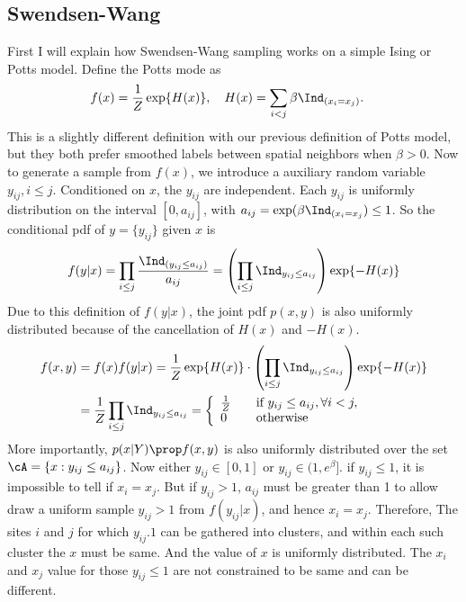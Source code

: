 \documentclass[12pt]{article}
\begin{document}
\subsection{Swendsen-Wang}
First I will explain how Swendsen-Wang sampling works on a simple Ising or Potts model. Define the Potts mode as
\begin{align*}
  f(x) &= \frac{1}{Z}\exp \{H(x)\}, \quad H(x) = \sum_{i<j} \beta \Ind_{(x_i = x_j)}.
\end{align*}
This is a slightly different definition with our previous definition of Potts model, but they both prefer smoothed labels between spatial neighbors when $\beta > 0$. Now to generate a sample from $f(x)$, we introduce a auxiliary random variable $y_{ij}, i \le j$. Conditioned on $x$, the $y_{ij}$ are independent. Each $y_{ij}$ is uniformly distribution on the interval $[0, a_{ij}]$, with $a_{ij} = \exp(\beta\Ind_{(x_i = x_j} ) \leq 1$. So the conditional pdf of $y = \{y_{ij}\}$ given $x$ is
\begin{equation*}
  f(y|x) = \prod_{i\le j}\frac{\Ind_{(y_{ij} \leq a_{ij})}}{a_{ij}} = \left (\prod_{i\le j}\Ind_{y_{ij} \leq a_{ij}} \right )\exp \{-H(x)\}
\end{equation*}
Due to this definition of $f(y|x)$, the joint pdf $p(x,y)$ is also uniformly distributed because of the cancellation of $H(x)$ and $-H(x)$.
\begin{align*}
  f(x,y) &= f(x) f(y|x) = \frac{1}{Z}\exp\{H(x)\} \cdot  \left (\prod_{i\le j}\Ind_{y_{ij} \leq a_{ij}} \right )\exp \{-H(x)\} \\
  & =  \frac{1}{Z} \prod_{i\le j}\Ind_{y_{ij} \leq a_{ij}} = \left \{
  \begin{array}{l l}
    \frac{1}{Z} & \quad \text{if $y_{ij} \leq a_{ij}, \forall i < j,$}\\
    0 & \quad \text{otherwise}\\
    \end{array} \right.
\end{align*}
More importantly, $p(x|Y) \prop f(x,y)$ is also uniformly distributed over the
set $\cA = \{x: y_{ij} \leq a_{ij}\}$. Now either $y_{ij} \in [0, 1]$ or $y_{ij}
\in (1, e^\beta]$. if $y_{ij} \leq 1$, it is impossible to tell if $x_i =
  x_j$. But if $y_{ij} > 1$, $a_{ij} $ must be greater than 1 to allow draw a
  uniform sample $y_{ij} > 1$ from $f(y_{ij} | x)$, and hence $x_i =
  x_j$. Therefore, The sites $i$ and $j$ for which $y_{ij} . 1$ can be gathered
  into clusters, and within each such cluster the $x$ must be same. And the
  value of $x$ is uniformly distributed. The $x_i$ and $x_j$ value for those
  $y_{ij} \leq 1$ are not constrained to be same and can be different.
\end{document}
